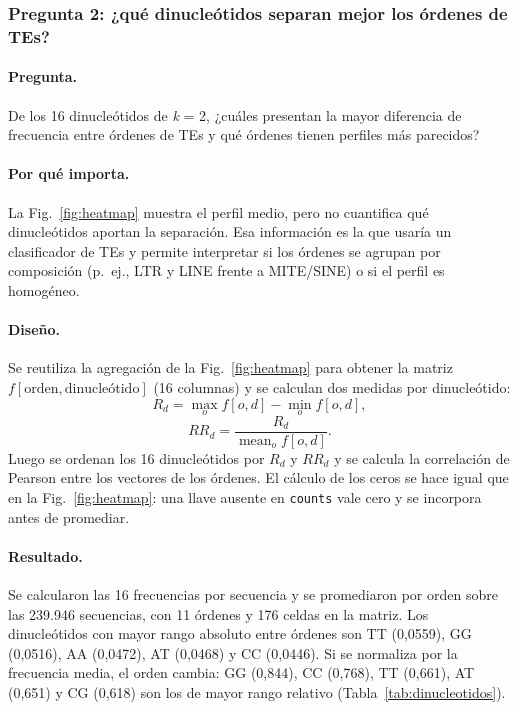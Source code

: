\documentclass[journal]{IEEEtran}
\begin{document}
\subsubsection{Pregunta 2: ¿qué dinucleótidos separan mejor los órdenes de TEs?}
\paragraph*{Pregunta.}
De los 16 dinucleótidos de \textit{k} = 2, ¿cuáles presentan la mayor diferencia de
frecuencia entre órdenes de TEs y qué órdenes tienen perfiles más parecidos?

\paragraph*{Por qué importa.}
La Fig.~\ref{fig:heatmap} muestra el perfil medio, pero no cuantifica qué dinucleótidos
aportan la separación. Esa información es la que usaría un clasificador de TEs y permite
interpretar si los órdenes se agrupan por composición (p.~ej., LTR y LINE frente a
MITE/SINE) o si el perfil es homogéneo.

\paragraph*{Diseño.}
Se reutiliza la agregación de la Fig.~\ref{fig:heatmap} para obtener la matriz
$f[\text{orden}, \text{dinucleótido}]$ (16 columnas) y se calculan dos medidas por
dinucleótido:
\begin{equation}
R_d = \max_o f[o,d] - \min_o f[o,d],
\label{eq:rango}
\end{equation}
\begin{equation}
RR_d = \frac{R_d}{\operatorname{mean}_o f[o,d]}.
\label{eq:rango_relativo}
\end{equation}
Luego se ordenan los 16 dinucleótidos por $R_d$ y $RR_d$ y se calcula la correlación de
Pearson entre los vectores de los órdenes. El cálculo de los ceros se hace igual que en la
Fig.~\ref{fig:heatmap}: una llave ausente en \texttt{counts} vale cero y se incorpora antes
de promediar.

\paragraph*{Resultado.}
Se calcularon las 16 frecuencias por secuencia y se promediaron por orden sobre las 239.946
secuencias, con 11 órdenes y 176 celdas en la matriz. Los dinucleótidos con mayor rango
absoluto entre órdenes son TT (0,0559), GG (0,0516), AA (0,0472), AT (0,0468) y CC
(0,0446). Si se normaliza por la frecuencia media, el orden cambia: GG (0,844), CC (0,768),
TT (0,661), AT (0,651) y CG (0,618) son los de mayor rango relativo
(Tabla~\ref{tab:dinucleotidos}).
\end{document}
